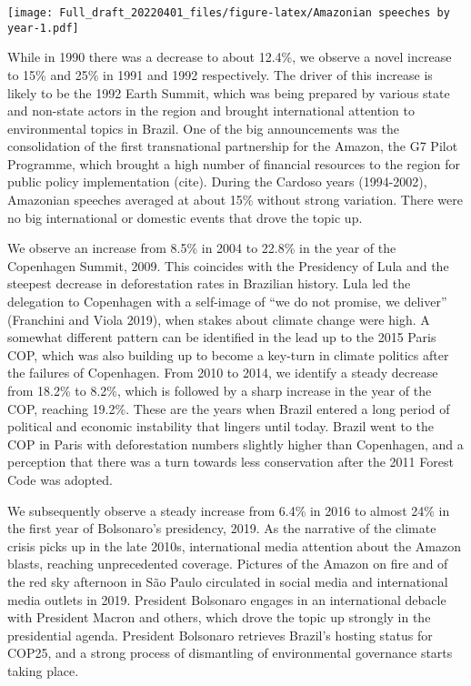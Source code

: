 \documentclass[
]{article}
\begin{document}
\texttt{[image: Full\_draft\_20220401\_files/figure-latex/Amazonian speeches by year-1.pdf]}

While in 1990 there was a decrease to about 12.4\%, we observe a novel
increase to 15\% and 25\% in 1991 and 1992 respectively. The driver of
this increase is likely to be the 1992 Earth Summit, which was being
prepared by various state and non-state actors in the region and brought
international attention to environmental topics in Brazil. One of the
big announcements was the consolidation of the first transnational
partnership for the Amazon, the G7 Pilot Programme, which brought a high
number of financial resources to the region for public policy
implementation (cite). During the Cardoso years (1994-2002), Amazonian
speeches averaged at about 15\% without strong variation. There were no
big international or domestic events that drove the topic up.

We observe an increase from 8.5\% in 2004 to 22.8\% in the year of the
Copenhagen Summit, 2009. This coincides with the Presidency of Lula and
the steepest decrease in deforestation rates in Brazilian history. Lula
led the delegation to Copenhagen with a self-image of ``we do not
promise, we deliver'' (Franchini and Viola 2019), when stakes about
climate change were high. A somewhat different pattern can be identified
in the lead up to the 2015 Paris COP, which was also building up to
become a key-turn in climate politics after the failures of Copenhagen.
From 2010 to 2014, we identify a steady decrease from 18.2\% to 8.2\%,
which is followed by a sharp increase in the year of the COP, reaching
19.2\%. These are the years when Brazil entered a long period of
political and economic instability that lingers until today. Brazil went
to the COP in Paris with deforestation numbers slightly higher than
Copenhagen, and a perception that there was a turn towards less
conservation after the 2011 Forest Code was adopted.

We subsequently observe a steady increase from 6.4\% in 2016 to almost
24\% in the first year of Bolsonaro's presidency, 2019. As the narrative
of the climate crisis picks up in the late 2010s, international media
attention about the Amazon blasts, reaching unprecedented coverage.
Pictures of the Amazon on fire and of the red sky afternoon in São Paulo
circulated in social media and international media outlets in 2019.
President Bolsonaro engages in an international debacle with President
Macron and others, which drove the topic up strongly in the presidential
agenda. President Bolsonaro retrieves Brazil's hosting status for COP25,
and a strong process of dismantling of environmental governance starts
taking place.
\end{document}
